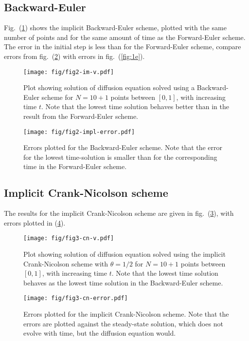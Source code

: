 \documentclass[a4paper,11pt]{article}
\begin{document}
\subsection{Backward-Euler}
Fig.~(\ref{fig:2}) shows the implicit Backward-Euler scheme, plotted with the same number of points and for the same amount of time as the Forward-Euler scheme. The error in the initial step is less than for the Forward-Euler scheme, compare errors from fig.~(\ref{fig:2e}) with errors in fig.~(\ref{fig:1e}).

\begin{figure}[htb]
    \centering
    \texttt{[image: fig/fig2-im-v.pdf]}
    \caption{Plot showing solution of diffusion equation solved using a Backward-Euler scheme for $N=10+1$ points between $[0,1]$, with increasing time $t$. Note that the lowest time solution behaves better than in the result from the Forward-Euler scheme.}
    \label{fig:2}
\end{figure}

\begin{figure}[htpb]
    \centering
    \texttt{[image: fig/fig2-impl-error.pdf]}
    \caption{Errors plotted for the Backward-Euler scheme. Note that the error for the lowest time-solution is smaller than for the corresponding time in the Forward-Euler scheme.}
    \label{fig:2e}
\end{figure}

\subsection{Implicit Crank-Nicolson scheme}
The results for the implicit Crank-Nicolson scheme are given in fig.~(\ref{fig:3}), with errors plotted in (\ref{fig:3e}). 

\begin{figure}[htb]
    \centering
    \texttt{[image: fig/fig3-cn-v.pdf]}
    \caption{Plot showing solution of diffusion equation solved using the implicit Crank-Nicolson scheme with $\theta =1/2$ for $N=10+1$ points between $[0,1]$, with increasing time $t$. Note that the lowest time solution behaves as the lowest time solution in the Backward-Euler scheme.}
    \label{fig:3}
\end{figure}

\begin{figure}[htpb]
    \centering
    \texttt{[image: fig/fig3-cn-error.pdf]}
    \caption{Errors plotted for the implicit Crank-Nicolson scheme. Note that the errors are plotted against the steady-state solution, which does not evolve with time, but the diffusion equation would.}
    \label{fig:3e}
\end{figure}
\end{document}
